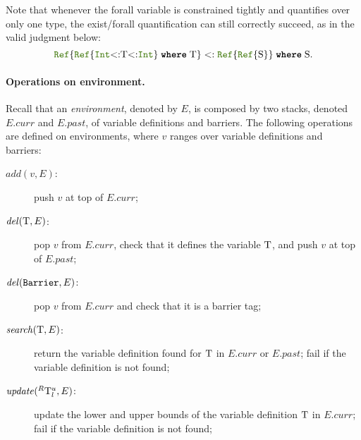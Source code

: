 Note that whenever the forall variable is constrained tightly and
quantifies over only one type, the exist/forall quantification can still
correctly succeed, as in the valid judgment below:
\[ 
  \reftyp{\wheret{\reftyp{\inttyp{<:}\T{<:}\inttyp}}{\T}} <: 
  \wheret{\reftyp{\reftyp{\S}}}{\S}.
\]

\paragraph{Operations on environment.}
Recall that an \emph{environment}, denoted by \(E\),
is composed by two stacks, denoted \(E.curr\) and \(E.past\),
of variable definitions and barriers.
The following operations are
defined on environments, where \(v\)  ranges over variable
definitions and barriers:
\begin{description}
\item[\normalfont\(\mathit{add}(v,E)\):] push \(v\) at top of
  \(E.curr\);
\item[\normalfont\(\mathit{del}(\mathrm{T},E)\):] pop \(v\) from
  \(E.curr\), check that it defines the variable \(\mathrm{T}\), and
  push \(v\) at top of \(E.past\);

\item[\normalfont\(\mathit{del}(\text{\texttt{Barrier}},E)\):] pop \(v\) from
  \(E.curr\) and check that it is a barrier tag;

\item[\normalfont\(\mathit{search}(\mathrm{T},E)\):] return the variable definition
  found for \(\mathrm{T}\) in \(E.curr\) or \(E.past\); fail if
  the variable definition is not found;

\item[\normalfont\(\mathit{update}(^R \mathrm{T}_l^u, E)\):] update the lower
  and upper bounds of the variable definition \(\mathrm{T}\) in
  \(E.curr\); %
  fail if the variable definition is not found;


\end{description}

